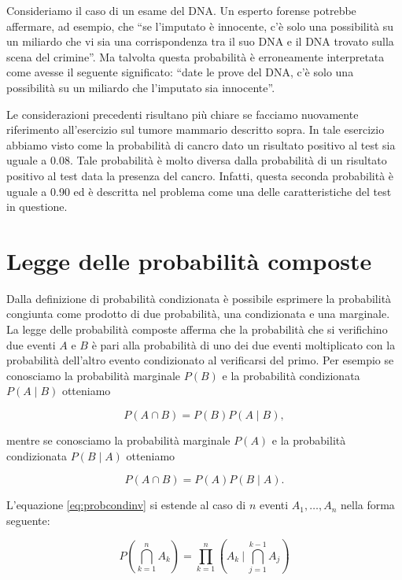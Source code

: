 \documentclass[
  11pt,
]{krantz}
\theoremstyle{definition}
\theoremstyle{definition}
\theoremstyle{definition}
\theoremstyle{definition}
\theoremstyle{remark}
\begin{document}
Consideriamo il caso di un esame del DNA. Un esperto forense potrebbe affermare, ad esempio, che ``se l'imputato è innocente, c'è solo una possibilità su un miliardo che vi sia una corrispondenza tra il suo DNA e il DNA trovato sulla scena del crimine''. Ma talvolta questa probabilità è erroneamente interpretata come avesse il seguente significato: ``date le prove del DNA, c'è solo una possibilità su un miliardo che l'imputato sia innocente''.

Le considerazioni precedenti risultano più chiare se facciamo nuovamente riferimento all'esercizio sul tumore mammario descritto sopra. In tale esercizio abbiamo visto come la probabilità di cancro dato un risultato positivo al test sia uguale a 0.08. Tale probabilità è molto diversa dalla probabilità di un risultato positivo al test data la presenza del cancro. Infatti, questa seconda probabilità è uguale a 0.90 ed è descritta nel problema come una delle caratteristiche del test in questione.

\hypertarget{legge-delle-probabilituxe0-composte}{%
\section{Legge delle probabilità composte}\label{legge-delle-probabilituxe0-composte}}

Dalla definizione di probabilità condizionata è possibile esprimere la probabilità congiunta come prodotto di due probabilità, una condizionata e una marginale. La legge delle probabilità composte afferma che la probabilità che si verifichino due eventi \(A\) e \(B\) è pari alla probabilità di uno dei due eventi moltiplicato con la probabilità dell'altro evento condizionato al verificarsi del primo. Per esempio se conosciamo la probabilità marginale \(P(B)\) e la probabilità condizionata \(P(A \mid B)\) otteniamo

\begin{equation}
P(A \cap B) = P(B)P(A \mid B),
\label{eq:probcondinv}
\end{equation}

mentre se conosciamo la probabilità marginale \(P(A)\) e la probabilità condizionata \(P(B \mid A)\) otteniamo

\[
P(A \cap B) = P(A)P(B \mid A).
\]

L'equazione \eqref{eq:probcondinv} si estende al caso di \(n\) eventi \(A_1, \dots, A_n\) nella forma seguente:

\begin{equation}
P\left( \bigcap_{k=1}^n A_k \right) = \prod_{k=1}^n \left(  A_k  \ \Biggl\lvert \ \bigcap_{j=1}^{k-1} A_j \right)
\label{eq:probcomposte}
\end{equation}
\end{document}
